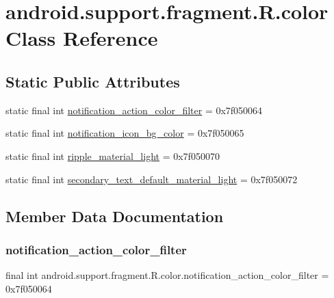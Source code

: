 \hypertarget{classandroid_1_1support_1_1fragment_1_1R_1_1color}{}\section{android.\+support.\+fragment.\+R.\+color Class Reference}
\label{classandroid_1_1support_1_1fragment_1_1R_1_1color}
\subsection*{Static Public Attributes}
\begin{DoxyCompactItemize}
\item 
static final int \mbox{\hyperlink{classandroid_1_1support_1_1fragment_1_1R_1_1color_a19c7d4407581b392f3389b88ebdf6597}{notification\+\_\+action\+\_\+color\+\_\+filter}} = 0x7f050064
\item 
static final int \mbox{\hyperlink{classandroid_1_1support_1_1fragment_1_1R_1_1color_a9df2919f981afbde1f1b486b1c24cb36}{notification\+\_\+icon\+\_\+bg\+\_\+color}} = 0x7f050065
\item 
static final int \mbox{\hyperlink{classandroid_1_1support_1_1fragment_1_1R_1_1color_a7480abdd10ed4536230e8eb53b54c0a0}{ripple\+\_\+material\+\_\+light}} = 0x7f050070
\item 
static final int \mbox{\hyperlink{classandroid_1_1support_1_1fragment_1_1R_1_1color_a7c56b5616006a7293aa178691505aa2d}{secondary\+\_\+text\+\_\+default\+\_\+material\+\_\+light}} = 0x7f050072
\end{DoxyCompactItemize}


\subsection{Member Data Documentation}
\mbox{\label{classandroid_1_1support_1_1fragment_1_1R_1_1color_a19c7d4407581b392f3389b88ebdf6597}} 
\subsubsection{\texorpdfstring{notification\+\_\+action\+\_\+color\+\_\+filter}{notification\_action\_color\_filter}}
{\footnotesize\ttfamily final int android.\+support.\+fragment.\+R.\+color.\+notification\+\_\+action\+\_\+color\+\_\+filter = 0x7f050064\hspace{0.3cm}{\ttfamily [static]}}

